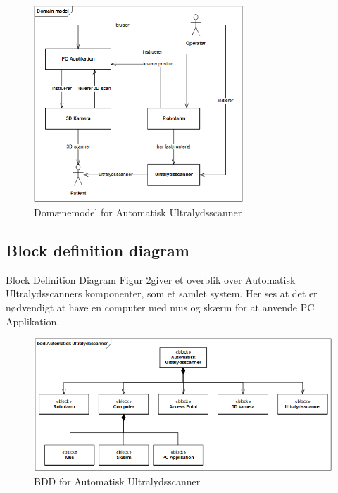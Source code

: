 \begin{figure}[H]
    \centering
    \includegraphics[width=0.7\textwidth]{figurer/d/Design/uml_domain}
    \caption{Domænemodel for Automatisk Ultralydsscanner}
    \label{domain}
\end{figure}

\subsection{Block definition diagram}
Block Definition Diagram Figur \ref{BDD}giver et overblik over Automatisk Ultralydsscanners komponenter, som et samlet system.
Her ses at det er nødvendigt at have en computer med mus og skærm for at anvende PC Applikation.

\begin{figure}[H]
    \centering
    \includegraphics[width=1\textwidth]{figurer/d/Design/BDD}
    \caption{BDD for Automatisk Ultralydsscanner}
    \label{BDD}
\end{figure}
\newpage

